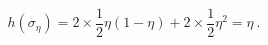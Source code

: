 \begin{equation}
h(\sigma_{\eta})= 2 \times \frac{1}{2} \eta (1-\eta) 
 + 2 \times \frac{1}{2} \eta^2 = \eta ~.
\end{equation}

